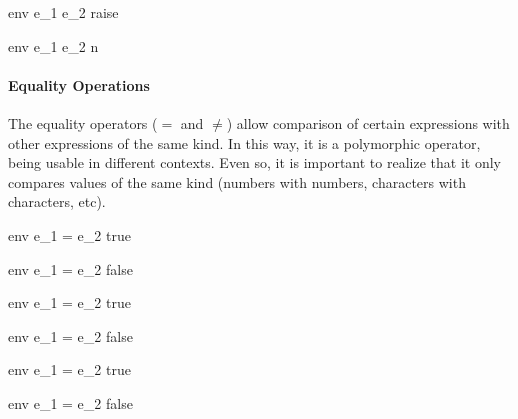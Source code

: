 \documentclass{article}
\begin{document}
    {\mbox{env} \vdash e_1 \div e_2 \Downarrow raise}
    
    {\mbox{env} \vdash e_1 \div e_2 \Downarrow n}
    
\paragraph{Equality Operations}
The equality operators ($=$ and $\neq$) allow comparison of certain expressions with other expressions of the same kind.
In this way, it is a polymorphic operator, being usable in different contexts.
Even so, it is important to realize that it only compares values of the same kind (numbers with numbers, characters with characters, etc).

\medskip

    {\mbox{env} \vdash e_1 = e_2 \Downarrow true}
    
    {\mbox{env} \vdash e_1 = e_2 \Downarrow false}
    
\medskip

    {\mbox{env} \vdash e_1 = e_2 \Downarrow true}
    
    {\mbox{env} \vdash e_1 = e_2 \Downarrow false}
    
\medskip
    
    {\mbox{env} \vdash e_1 = e_2 \Downarrow true}
    
    {\mbox{env} \vdash e_1 = e_2 \Downarrow false}
    
\end{document}

